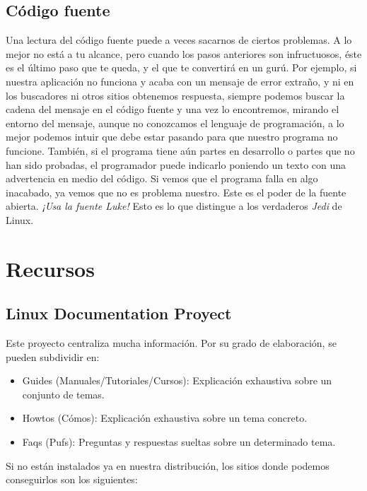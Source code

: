 \subsection{Código fuente}

Una  lectura del  código  fuente  puede a  veces  sacarnos de  ciertos
problemas. A  lo mejor  no está  a tu alcance,  pero cuando  los pasos
anteriores son infructuosos, éste es el último paso que te queda, y el
que te  convertirá en un gurú.  Por ejemplo, si nuestra  aplicación no
funciona  y  acaba con  un  mensaje  de error  extraño,  y  ni en  los
buscadores ni otros sitios obtenemos respuesta, siempre podemos buscar
la cadena  del mensaje en el  código fuente y una  vez lo encontremos,
mirando el  entorno del mensaje,  aunque no conozcamos el  lenguaje de
programación, a  lo mejor podemos  intuir que debe estar  pasando para
que nuestro  programa no funcione.  También, si el programa  tiene aún
partes en desarrollo o partes que no han sido probadas, el programador
puede indicarlo  poniendo un  texto con una  advertencia en  medio del
código. Si vemos que el programa  falla en algo inacabado, ya vemos que no
es problema nuestro. Este es el  poder de la fuente abierta. {\em ¡Usa
la fuente Luke!} Esto es lo  que distingue a los verdaderos {\em Jedi}
de Linux.


\section{Recursos}

\subsection{Linux Documentation Proyect}

Este proyecto centraliza mucha información. Por su grado de elaboración,
se pueden subdividir en:

\begin{itemize}
\item Guides (Manuales/Tutoriales/Cursos): Explicación exhaustiva sobre
un conjunto de temas.
\item Howtos (Cómos): Explicación exhaustiva sobre un tema concreto.
\item Faqs (Pufs): Preguntas y respuestas sueltas sobre un determinado tema.
\end{itemize}
Si no están instalados ya en nuestra distribución, los sitios donde
podemos conseguirlos son los siguientes:

